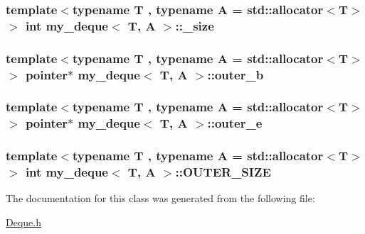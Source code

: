\hypertarget{classmy__deque_a9d27e92833c2e24410dae3b329ebc5da}{
\subsubsection[{\-\_\-size}]{\setlength{\rightskip}{0pt plus 5cm}template$<$typename T , typename A  = std\-::allocator$<$\-T$>$$>$ int {\bf my\-\_\-deque}$<$ T, A $>$\-::\-\_\-size\hspace{0.3cm}{\ttfamily [private]}}}\label{classmy__deque_a9d27e92833c2e24410dae3b329ebc5da}
\hypertarget{classmy__deque_afe69687aa94aa63dbb23e147a90db3d1}{
\subsubsection[{outer\-\_\-b}]{\setlength{\rightskip}{0pt plus 5cm}template$<$typename T , typename A  = std\-::allocator$<$\-T$>$$>$ {\bf pointer}$\ast$ {\bf my\-\_\-deque}$<$ T, A $>$\-::outer\-\_\-b\hspace{0.3cm}{\ttfamily [private]}}}\label{classmy__deque_afe69687aa94aa63dbb23e147a90db3d1}
\hypertarget{classmy__deque_a4d7496e28dd1a7bda7df4c6861b1f5c1}{
\subsubsection[{outer\-\_\-e}]{\setlength{\rightskip}{0pt plus 5cm}template$<$typename T , typename A  = std\-::allocator$<$\-T$>$$>$ {\bf pointer}$\ast$ {\bf my\-\_\-deque}$<$ T, A $>$\-::outer\-\_\-e\hspace{0.3cm}{\ttfamily [private]}}}\label{classmy__deque_a4d7496e28dd1a7bda7df4c6861b1f5c1}
\hypertarget{classmy__deque_a27647dca34c708d1b4705ede6d46fd7e}{
\subsubsection[{O\-U\-T\-E\-R\-\_\-\-S\-I\-Z\-E}]{\setlength{\rightskip}{0pt plus 5cm}template$<$typename T , typename A  = std\-::allocator$<$\-T$>$$>$ int {\bf my\-\_\-deque}$<$ T, A $>$\-::O\-U\-T\-E\-R\-\_\-\-S\-I\-Z\-E\hspace{0.3cm}{\ttfamily [private]}}}\label{classmy__deque_a27647dca34c708d1b4705ede6d46fd7e}


The documentation for this class was generated from the following file\-:\begin{DoxyCompactItemize}
\item 
\hyperlink{Deque_8h}{Deque.\-h}\end{DoxyCompactItemize}
